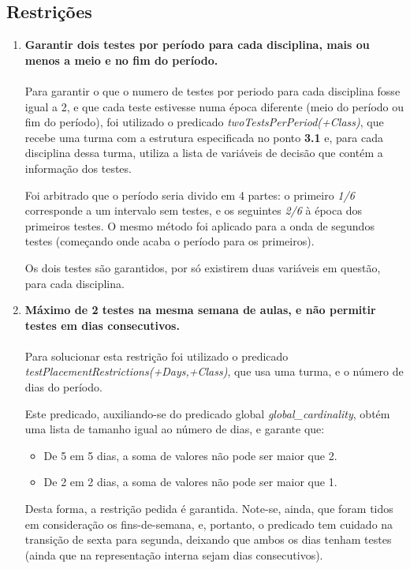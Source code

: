 \documentclass{llncs}
\begin{document}
\subsection{Restrições} 
\begin{enumerate}

	\item \textbf{Garantir dois testes por período para cada disciplina, mais ou menos a meio e no fim do período.}\\\\
		Para garantir o que o numero de testes por periodo para cada disciplina fosse igual a 2, e que cada teste estivesse numa época diferente (meio do período ou fim do período), foi utilizado o predicado 	               
		\textit{twoTestsPerPeriod(+Class)}, que recebe uma turma com a estrutura especificada no ponto  \textbf{3.1} e, para cada disciplina dessa turma, utiliza a lista de variáveis de decisão que contém a informação dos testes.\par 
Foi arbitrado que o período seria divido em 4 partes: o primeiro \textit{1/6} corresponde a um intervalo sem testes, e os seguintes \textit{2/6} à época dos primeiros testes. O mesmo método foi aplicado para a onda de segundos testes (começando onde acaba o período para os primeiros).\par
		Os dois testes são garantidos, por só existirem duas variáveis em questão, para cada disciplina.
		\\
	
\newpage
			
	\item \textbf{Máximo de 2 testes na mesma semana de aulas, e não permitir testes em dias consecutivos.} \\\\
		Para solucionar esta restrição foi utilizado o predicado \textit{testPlacementRestrictions(+Days,+Class)}, que usa uma turma, e o número de dias do período.\par
		Este predicado, auxiliando-se do predicado global \textit{global\_cardinality}, obtém uma lista de tamanho igual ao número de dias, e garante que:
		\begin{itemize}
			\item De 5 em 5 dias, a soma de valores não pode ser maior que 2.
			\item De 2 em 2 dias, a soma de valores não pode ser maior que 1.
		\end{itemize}
		Desta forma, a restrição pedida é garantida. Note-se, ainda, que foram tidos em consideração os fins-de-semana, e, portanto, o predicado tem cuidado na transição de sexta para segunda, deixando que ambos os dias tenham testes (ainda que na representação interna sejam dias consecutivos).
		\\


\end{enumerate}
\end{document}
